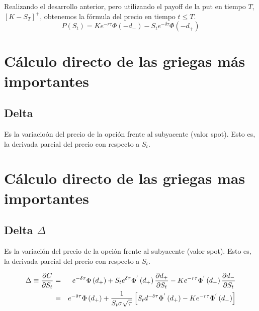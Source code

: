 \documentclass[12pt]{article}
\begin{document}
Realizando el desarrollo anterior, pero utilizando el payoff de la put en tiempo $T$, $\left[K-S_{T}\right]^{+}$, obtenemos
la f\'{o}rmula del precio en tiempo $t\leq T$.
\newline
\begin{equation}
	P\left(S_{t}\right) = Ke^{-r\tau}\Phi\left(-d_{-}\right) - S_{t}e^{-\delta\tau}\Phi\left(-d_{+}\right)
\end{equation}
\newline

\section{C\'{a}lculo directo de las griegas m\'{a}s importantes}
\subsection{Delta}

Es la variacio\'{o}n del precio de la opci\'{o}n frente al subyacente (valor spot). Esto es, la derivada parcial del precio con respecto a 
$S_{t}$.
\newline

\section{C\'{a}lculo directo de las griegas mas importantes}
\subsection{Delta $\Delta$}

Es la variaci\'{o}n del precio de la opci\'{o}n frente al subyacente (valor spot). Esto es, la derivada parcial del precio con respecto a 
$S_{t}$.
\newline

\begin{eqnarray}
	\Delta\equiv\frac{\partial C}{\partial S_{t}} & = & e^{-\delta\tau}\Phi\left(d_{+}\right) + 
								S_{t}e^{\-\delta\tau}\Phi^{'}\left(d_{+}\right)
								\frac{\partial d_{+}}{\partial S_{t}} - Ke^{-r\tau}
								\Phi^{'}\left(d_{-}\right)\frac{\partial d_{-}}{\partial S_{t}} 
								\nonumber \\
					& = & e^{-\delta\tau}\Phi\left(d_{+}\right) + 
						\frac{1}{S_{t}\sigma\sqrt{\tau}}\left[S_{t}d^{-\delta\tau}
						\Phi^{'}\left(d_{+}\right)-Ke^{-r\tau}\Phi^{'}\left(d_{-}\right)\right] 
								\nonumber 
\end{eqnarray}
\newline
\end{document}

